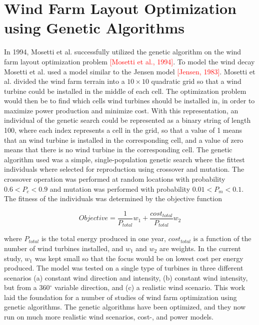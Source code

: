 \section{Wind Farm Layout Optimization using Genetic Algorithms}

In 1994, Mosetti et al. successfully utilized the genetic algorithm on the wind farm layout optimization problem \textcolor{red}{[Mosetti et al., 1994]}. To model the wind decay Mosetti et al. used a model similar to the Jensen model \textcolor{red}{[Jensen, 1983]}. Mosetti et al. divided the wind farm terrain into a $10\times10$ quadratic grid so that a wind turbine could be installed in the middle of each cell. The optimization problem would then be to find which cells wind turbines should be installed in, in order to maximize power production and minimize cost. With this representation, an individual of the genetic search could be represented as a binary string of length 100, where each index represents a cell in the grid, so that a value of 1 means that an wind turbine is installed in the corresponding cell, and a value of zero means that there is no wind turbine in the corresponding cell. The genetic algorithm used was a simple, single-population genetic search where the fittest individuals where selected for reproduction using crossover and mutation. The crossover operation was performed at random locations with probability $0.6 < P_c < 0.9$ and mutation was performed with probability $0.01 < P_m < 0.1$. The fitness of the individuals was determined by the objective function

\begin{equation}
Objective = \frac{1}{P_{total}}w_1 + \frac{cost_{total}}{P_{total}}w_2
\label{Objective function Mosetti et al.}
\end{equation}

where $P_{total}$ is the total energy produced in one year, $cost_{total}$ is a function of the number of wind turbines installed, and $w_1$ and $w_2$ are weights. In the current study, $w_1$ was kept small so that the focus would be on lowest cost per energy produced. The model was tested on a single type of turbines in three different scenarios (a) constant wind direction and intensity, (b) constant wind intensity, but from a 360$^{\circ}$ variable direction, and (c) a realistic wind scenario. This work laid the foundation for a number of studies of wind farm optimization using genetic algorithms. The genetic algorithms have been optimized, and they now run on much more realistic wind scenarios, cost-, and power models.\\


